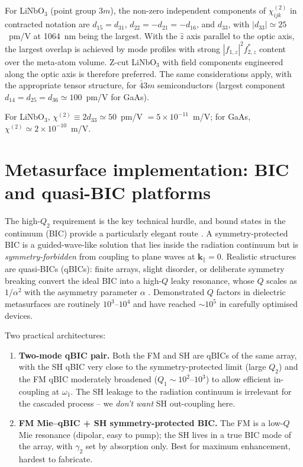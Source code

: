 \documentclass[11pt,a4paper]{article}
\newcommand{\bvec}[1]{\mathbf{#1}}
\newcommand{\chitwo}{\chi^{(2)}}
\begin{document}
For LiNbO$_3$ (point group $3m$), the non-zero independent components of
$\chitwo_{ijk}$ in contracted notation are
$d_{15}=d_{31}$, $d_{22}=-d_{21}=-d_{16}$, and $d_{33}$, with
$|d_{33}|\simeq 25$~pm/V at 1064~nm being the largest.  With the
$\hat{z}$ axis parallel to the optic axis, the largest overlap is
achieved by mode profiles with strong $|f_{1,z}|^{2}f_{2,z}^{*}$ content
over the meta-atom volume.  Z-cut LiNbO$_3$ with field components
engineered along the optic axis is therefore preferred.  The same
considerations apply, with the appropriate tensor structure, for
$\bar{4}3m$ semiconductors (largest component $d_{14}=d_{25}=d_{36}\simeq 100$~pm/V
for GaAs).

For LiNbO$_3$, $\chitwo\equiv 2d_{33}\simeq 50$~pm/V $=5\times10^{-11}$~m/V;
for GaAs, $\chitwo\simeq 2\times10^{-10}$~m/V.

\section{Metasurface implementation: BIC and quasi-BIC platforms}

The high-$Q_2$ requirement is the key technical hurdle, and bound states
in the continuum (BIC) provide a particularly elegant route
\cite{Hsu2016}.  A symmetry-protected BIC is a guided-wave-like solution
that lies inside the radiation continuum but is \emph{symmetry-forbidden}
from coupling to plane waves at $\bvec{k}_\parallel=0$.  Realistic
structures are quasi-BICs (qBICs): finite arrays, slight disorder, or
deliberate symmetry breaking convert the ideal BIC into a high-$Q$ leaky
resonance, whose $Q$ scales as $1/\alpha^{2}$ with the asymmetry
parameter $\alpha$ \cite{Koshelev2018,Bulgakov2017}.  Demonstrated $Q$ factors in
dielectric metasurfaces are routinely $10^{3}$--$10^{4}$ and have
reached $\sim 10^{5}$ in carefully optimised devices.

Two practical architectures:
\begin{enumerate}
  \item[\textbf{(a)}] \textbf{Two-mode qBIC pair.}  Both the FM and SH
        are qBICs of the same array, with the SH qBIC very close to the
        symmetry-protected limit (large $Q_2$) and the FM qBIC
        moderately broadened ($Q_1\sim 10^{2}$--$10^{3}$) to allow
        efficient in-coupling at $\omega_1$.  The SH leakage to the
        radiation continuum is irrelevant for the cascaded process --
        we \emph{don't want} SH out-coupling here.

  \item[\textbf{(b)}] \textbf{FM Mie--qBIC + SH symmetry-protected BIC.}
        The FM is a low-$Q$ Mie resonance (dipolar, easy to pump); the
        SH lives in a true BIC mode of the array, with $\gamma_2$ set
        by absorption only.  Best for maximum enhancement, hardest to
        fabricate.
\end{enumerate}
\end{document}
